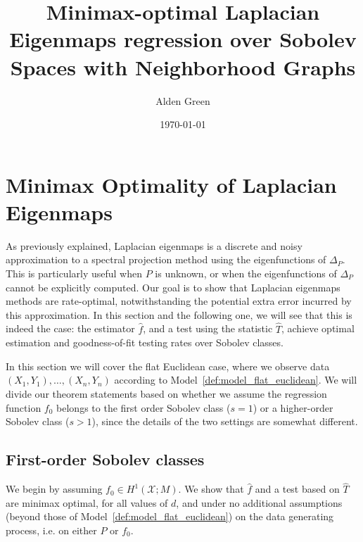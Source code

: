 \documentclass{article}
\newcommand{\1}{\mathbf{1}}
\newcommand{\mc}[1]{\mathcal{#1}}
\newcommand{\wh}[1]{\widehat{#1}}
\theoremstyle{alden}
\theoremstyle{aldenthm}
\theoremstyle{definition}
\theoremstyle{remark}
\begin{document}
\title{Minimax-optimal Laplacian Eigenmaps regression over Sobolev Spaces with Neighborhood Graphs}
\author{Alden Green}
\date{\today}
\maketitle




\section{Minimax Optimality of Laplacian Eigenmaps}
\label{sec:minimax_optimal_laplacian_eigenmaps}

As previously explained, Laplacian eigenmaps is a discrete and noisy approximation to a spectral projection method using the eigenfunctions of $\Delta_P$. This is particularly useful when $P$ is unknown, or when the eigenfunctions of $\Delta_P$ cannot be explicitly computed. Our goal is to show that Laplacian eigenmaps methods are rate-optimal, notwithstanding the potential extra error incurred by this approximation. In this section and the following one, we will see that this is indeed the case: the estimator $\wh{f}$, and a test using the statistic $\wh{T}$, achieve optimal estimation and goodness-of-fit testing rates over Sobolev classes. 

In this section we will cover the flat Euclidean case, where we observe data $(X_1,Y_1),\ldots,(X_n,Y_n)$ according to Model~\ref{def:model_flat_euclidean}. We will divide our theorem statements based on whether we assume the regression function $f_0$ belongs to the first order Sobolev class ($s = 1$) or a higher-order Sobolev class ($s > 1$), since the details of the two settings are somewhat different.

\subsection{First-order Sobolev classes}
\label{sec:first_order_sobolev_classes}
We begin by assuming $f_0 \in H^1(\mc{X}; M)$. We show that $\wh{f}$ and a test based on $\wh{T}$ are minimax optimal, for all values of $d$, and under no additional assumptions (beyond those of Model~\ref{def:model_flat_euclidean}) on the data generating process, i.e. on either $P$ or $f_0$.
\end{document}
